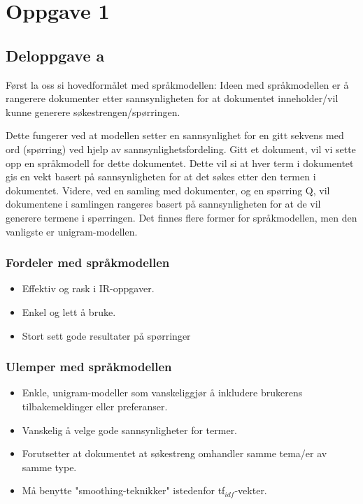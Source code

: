 \section*{Oppgave 1}
\subsection*{Deloppgave a}

\noindent Først la oss si hovedformålet med språkmodellen: Ideen med språkmodellen er å rangerere dokumenter etter sannsynligheten for at dokumentet inneholder/vil kunne generere søkestrengen/spørringen. 


Dette fungerer ved at modellen setter en sannsynlighet for en gitt sekvens med ord (spørring) ved hjelp av sannsynlighetsfordeling. Gitt et dokument, vil vi sette opp en språkmodell for dette dokumentet. Dette vil si at hver term i dokumentet gis en vekt basert på sannsynligheten for at det søkes etter den termen i dokumentet. Videre, ved en samling med dokumenter, og en spørring Q, vil dokumentene i samlingen rangeres basert på sannsynligheten for at de vil generere termene i spørringen. Det finnes flere former for språkmodellen, men den vanligste er unigram-modellen. 

\subsubsection*{Fordeler med språkmodellen}

\begin{itemize}
    \item Effektiv og rask i IR-oppgaver.
    \item Enkel og lett å bruke.
    \item Stort sett gode resultater på spørringer
\end{itemize}

\subsubsection*{Ulemper med språkmodellen}

\begin{itemize}
    \item Enkle, unigram-modeller som vanskeliggjør å inkludere brukerens tilbakemeldinger eller preferanser.
    \item Vanskelig å velge gode sannsynligheter for termer.
    \item Forutsetter at dokumentet at søkestreng omhandler samme tema/er av samme type.
    \item Må benytte "smoothing-teknikker" istedenfor tf$_{idf}$-vekter.
\end{itemize}

